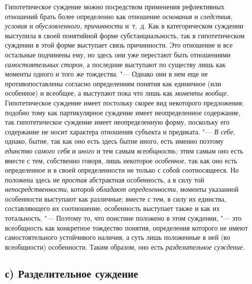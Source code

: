 Гипотетическое суждение можно посредством применения
рефлективных отношений брать более определенно как отношение
{\em основания} и {\em следствия, условия} и {\em обусловленного},
{\em причинности} и~т.~д.
Как в категорическом суждении выступила в своей понятийной форме
субстанциальность, так в гипотетическом суждении в этой форме выступает
связь причинности. Это отношение и все остальные подчинены ему, но здесь
они уже перестают быть отношениями
{\em самостоятельных сторон},
а последние выступают по существу лишь как моменты одного и
того же тождества. "--- Однако они в нем еще не
противопоставлены согласно определениям понятия как единичное (или
особенное) и всеобщее, а выступают пока что лишь как
{\em моменты вообще}.
Гипотетическое суждение имеет постольку скорее вид некоторого
предложения; подобно тому как партикулярное суждение имеет неопределенное
содержание, так гипотетическое суждение имеет неопределенную форму,
поскольку его содержание не носит характера отношения субъекта и
предиката. "--- {\em В себе},
однако, бытие, так как оно есть здесь бытие иного, есть
именно поэтому {\em единство самого
себя} и {\em иного}
и тем самым
{\em всеобщность;} этим
самым оно есть вместе с тем, собственно говоря, лишь некоторое
{\em особенное}, так как
оно есть определенное и в своей определенности не только с собой
соотносящееся. Но положена здесь не
{\em простая} абстрактная
особенность, а в силу той
{\em непосредственности},
которой {\em обладают
определенности}, моменты указанной особенности выступают как
различные; вместе с тем, в силу их единства, составляющего их соотношение,
особенность выступает также и как их тотальность. "---
Поэтому то, что поистине положено в этом суждении, "---
это всеобщность как конкретное тождество понятия,
определения которого не имеют самостоятельного устойчивого наличия, а суть
лишь положенные в ней (во всеобщности) особенности. Таким образом, оно есть
{\em разделительное суждение}.

\subsection[с) Разделительное суждение]{с) Разделительное суждение}

